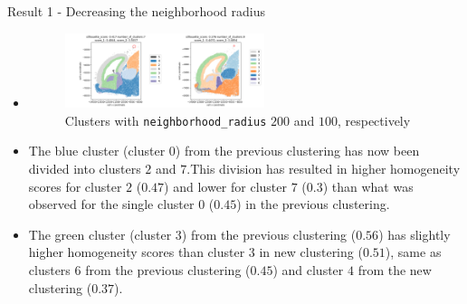 \documentclass{beamer}
\begin{document}
\begin{frame}{Result 1 - Decreasing the neighborhood radius}
\begin{itemize}
   \item<1-> []
   	\begin{figure}
   	 \includegraphics[width=0.55\textwidth]{clusters_1_3.png}
  	  \caption{Clusters with \texttt{neighborhood\_radius} $200$ and $100$, respectively}
	\end{figure} 
    \item<2->  The blue cluster (cluster $0$) from the previous clustering has now been divided into clusters $2$ and $7$.This division has resulted in higher homogeneity scores for cluster $2$ ($0.47$) and lower for cluster $7$ ($0.3$) than what was observed for the single cluster $0$ ($0.45$) in the previous clustering. 
    \item<3->  The green cluster (cluster $3$) from the previous clustering ($0.56$) has slightly higher homogeneity scores than cluster $3$ in new clustering ($0.51$), same as clusters $6$ from the previous clustering ($0.45$) and cluster $4$ from the new clustering ($0.37$).
\end{itemize}

\end{frame}
\end{document}
